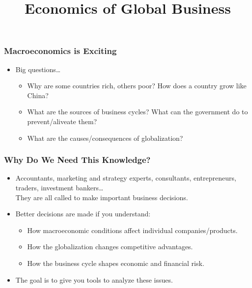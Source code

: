 \documentclass[10pt]{beamer}
\title[NYU Stern] %
{\Large Economics of Global Business}
\date[] %
\begin{document}
\begin{frame}
  \titlepage
\end{frame}

\begin{frame}[t]
\frametitle{Macroeconomics is Exciting}
\bigskip
\begin{itemize}
\item Big questions\ldots
\begin{itemize}
\medskip
\item Why are some countries rich, others poor? How does a country grow like China?
\medskip
\item What are the sources of business cycles? What can the government do to prevent/aliveate them?
\medskip
\item What are the causes/consequences of globalization?
\end{itemize}
\end{itemize}
\bigskip
\end{frame}


\begin{frame}[t]
\frametitle{Why Do We Need This Knowledge?}
\begin{itemize}
\item Accountants, marketing and strategy experts, consultants, entrepreneurs, traders, investment bankers\ldots\\
    \smallskip
    They are all called to make important business decisions.
\bigskip
\item Better decisions are made if you understand:
\begin{itemize}
\medskip
\item How macroeconomic conditions affect individual companies/products.
\medskip
\item How the globalization changes competitive advantages.
\medskip
\item How the business cycle shapes economic and financial risk.
\end{itemize}
\bigskip
\item The goal is to give you tools to analyze these issues. \\
\medskip
\end{itemize}
\end{frame}
\end{document}
